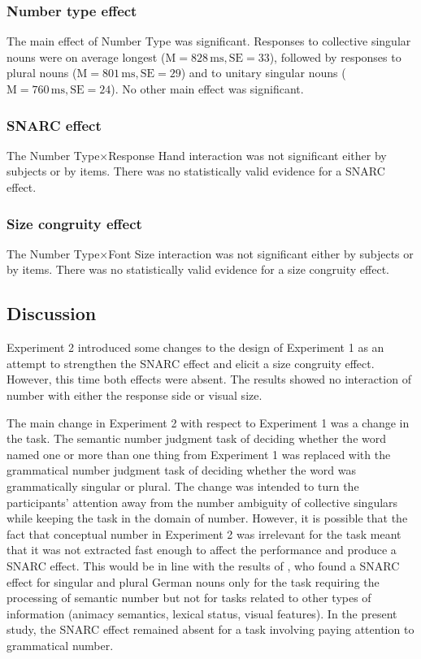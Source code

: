 \documentclass[output=paper]{langscibook}
\begin{document}
\subsubsection{Number type effect}
The main effect of Number Type was significant. Responses to collective singular nouns were on average longest ($\text{M}=828\,\text{ms}, \text{SE}=33$), followed by responses to plural nouns ($\text{M}=801\,\text{ms}, \text{SE}=29$) and to unitary singular nouns ($\text{M}=760\,\text{ms}, \text{SE}=24$). No other main effect was significant.

\subsubsection{SNARC effect}
The Number Type×Response Hand interaction was not significant either by subjects or by items. There was no statistically valid evidence for a SNARC effect.

\subsubsection{Size congruity effect}
The Number Type×Font Size interaction was not significant either by subjects or by items. There was no statistically valid evidence for a size congruity effect. 

\subsection{Discussion}
Experiment 2 introduced some changes to the design of Experiment 1 as an attempt to strengthen the SNARC effect and elicit a size congruity effect. However, this time both effects were absent. The results showed no interaction of number with either the response side or visual size. 

The main change in Experiment 2 with respect to Experiment 1 was a change in the task. The semantic number judgment task of deciding whether the word named one or more than one thing from Experiment 1 was replaced with the grammatical number judgment task of deciding whether the word was grammatically singular or plural. The change was intended to turn the participants’ attention away from the number ambiguity of collective singulars while keeping the task in the domain of number. However, it is possible that the fact that conceptual number in Experiment 2 was irrelevant for the task meant that it was not extracted fast enough to affect the performance and produce a SNARC effect. This would be in line with the results of \citet{rottgerGrammaticalNumberElicits2015}, who found a SNARC effect for singular and plural German nouns only for the task requiring the processing of semantic number but not for tasks related to other types of information (animacy semantics, lexical status, visual features). In the present study, the SNARC effect remained absent for a task involving paying attention to grammatical number.
\end{document}
